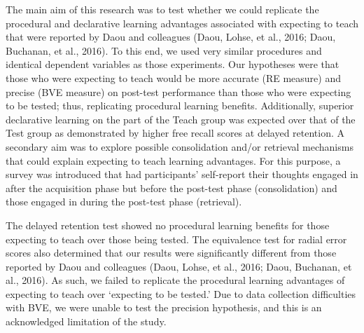 \documentclass[
  english,
  man,floatsintext]{apa7}
\begin{document}
The main aim of this research was to test whether we could replicate the procedural and declarative learning advantages associated with expecting to teach that were reported by Daou and colleagues (Daou, Lohse, et al., 2016; Daou, Buchanan, et al., 2016). To this end, we used very similar procedures and identical dependent variables as those experiments. Our hypotheses were that those who were expecting to teach would be more accurate (RE measure) and precise (BVE measure) on post-test performance than those who were expecting to be tested; thus, replicating procedural learning benefits. Additionally, superior declarative learning on the part of the Teach group was expected over that of the Test group as demonstrated by higher free recall scores at delayed retention. A secondary aim was to explore possible consolidation and/or retrieval mechanisms that could explain expecting to teach learning advantages. For this purpose, a survey was introduced that had participants' self-report their thoughts engaged in after the acquisition phase but before the post-test phase (consolidation) and those engaged in during the post-test phase (retrieval).

The delayed retention test showed no procedural learning benefits for those expecting to teach over those being tested. The equivalence test for radial error scores also determined that our results were significantly different from those reported by Daou and colleagues (Daou, Lohse, et al., 2016; Daou, Buchanan, et al., 2016). As such, we failed to replicate the procedural learning advantages of expecting to teach over `expecting to be tested.' Due to data collection difficulties with BVE, we were unable to test the precision hypothesis, and this is an acknowledged limitation of the study.
\end{document}
